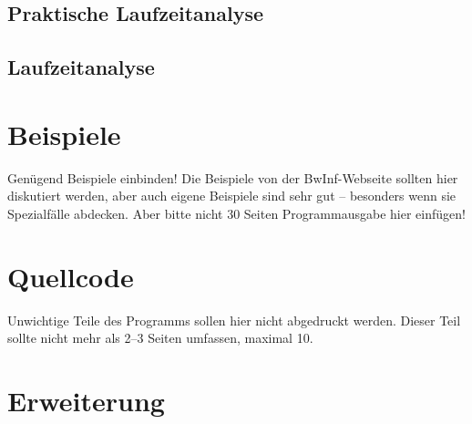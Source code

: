 \documentclass[a4paper,10pt,ngerman]{scrartcl}
\begin{document}
\subsection{Praktische Laufzeitanalyse}

\subsection{Laufzeitanalyse}

\section{Beispiele}
Genügend Beispiele einbinden! Die Beispiele von der BwInf-Webseite sollten hier diskutiert werden, aber auch eigene Beispiele sind sehr gut – besonders wenn sie Spezialfälle abdecken. Aber bitte nicht 30 Seiten Programmausgabe hier einfügen!

\section{Quellcode}
Unwichtige Teile des Programms sollen hier nicht abgedruckt werden. Dieser Teil sollte nicht mehr als 2–3 Seiten umfassen, maximal 10.

\section{Erweiterung}
\end{document}

